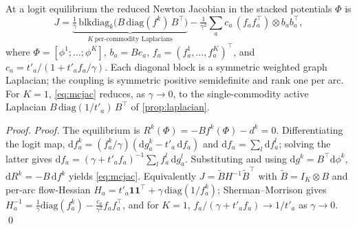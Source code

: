 \documentclass[ijoc]{informs3}
\begin{document}
\begin{proposition}\label{prop:mc}
At a logit equilibrium the reduced Newton Jacobian in the stacked potentials $\Phi$ is
\begin{equation}\label{eq:mcjac}
  J=\underbrace{\tfrac1\gamma\,\mathrm{blkdiag}_k\!\bigl(B\,\mathrm{diag}(f^k)\,B^\top\bigr)}_{K\ \text{per-commodity Laplacians}}
   -\tfrac1{\gamma^2}\sum_a c_a\,(f_a f_a^\top)\otimes b_a b_a^\top,
\end{equation}
where $\Phi=[\phi^1;\dots;\phi^K]$, $b_a=Be_a$, $f_a=(f^1_a,\dots,f^K_a)^\top$, and $c_a=t'_a/(1+t'_a f_a/\gamma)$. Each diagonal block is a symmetric weighted graph Laplacian;
the coupling is symmetric positive semidefinite and rank one per arc. For $K=1$, \cref{eq:mcjac} reduces, as
$\gamma\to0$, to the single-commodity active Laplacian $B\,\mathrm{diag}(1/t'_a)\,B^\top$ of \cref{prop:laplacian}.
\end{proposition}
\begin{proof}{\it Proof.}
The equilibrium is $R^k(\Phi)=-Bf^k(\Phi)-d^k=0$. Differentiating the logit map,
$\mathrm{d}f^k_a=(f^k_a/\gamma)(\mathrm{d}g^k_a-t'_a\,\mathrm{d}f_a)$ and $\mathrm{d}f_a=\sum_l\mathrm{d}f^l_a$; solving
the latter gives $\mathrm{d}f_a=(\gamma+t'_af_a)^{-1}\sum_l f^l_a\,\mathrm{d}g^l_a$. Substituting and using
$\mathrm{d}g^k=B^\top\mathrm{d}\phi^k$, $\mathrm{d}R^k=-B\,\mathrm{d}f^k$ yields \cref{eq:mcjac}. Equivalently
$J=\tilde B H^{-1}\tilde B^\top$ with $\tilde B=I_K\otimes B$ and per-arc flow-Hessian
$H_a=t'_a\mathbf1\mathbf1^\top+\gamma\,\mathrm{diag}(1/f^k_a)$; Sherman--Morrison gives
$H_a^{-1}=\tfrac1\gamma\mathrm{diag}(f^k_a)-\tfrac{c_a}{\gamma^2}f_af_a^\top$, and for $K=1$,
$f_a/(\gamma+t'_af_a)\to1/t'_a$ as $\gamma\to0$. \qed
\end{proof}
\end{document}
